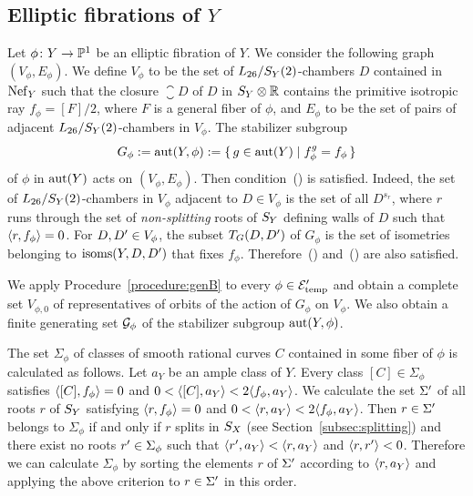 \documentclass{amsart}
\numberwithin{procedure}{section}
\begin{document}
\subsection{Elliptic fibrations of $Y$}\label{subsec:Ells}
%
Let $\phi\colon Y\to \P^1$ be an elliptic fibration of  $Y$.
We consider the following graph  $(V_{\phi}, E_{\phi})$.
We define $V_{\phi}$ to be the set of $\LSY$-chambers $D$ contained in $\NefY$
such that the closure $\closure{D}$  of $D$ in $\SY\tensor\R$ contains the 
primitive isotropic ray  $f_{\phi}=[F]/2$, where $F$ is a general fiber of $\phi$,
and $E_{\phi}$ to be the set of pairs of adjacent $\LSY$-chambers in $V_{\phi}$.
The stabilizer subgroup
\[
G_{\phi}:=\aut(Y, \phi):=\set{g\in \aut(Y)}{f_{\phi}^g=f_{\phi}}
\]
of $\phi$ in $\aut(Y)$
acts on $(V_{\phi}, E_{\phi})$.
Then condition~() is satisfied.
Indeed, the set of $\LSY$-chambers in $V_{\phi}$ adjacent to $D\in V_{\phi}$ is
the set of all 
$ D^{s_r}$, where $r$ runs through the set of  \emph{non-splitting} roots of $\SY$ 
defining walls of $D$
such that $\intf{r, f_{\phi}}=0$.
For $D, D\sprime\in V_{\phi}$,  the subset $\TG (D, D\sprime)$ of $G_{\phi}$ is
the set of isometries belonging to $\isoms(Y, D, D\sprime)$ that fixes $f_{\phi}$.
Therefore~() and~() are also satisfied.
\par
We apply Procedure~\ref{procedure:genB}
to every $\phi\in \Ells_{\temp}\sprime$
and obtain a complete set $V_{\phi, 0}$
of representatives of orbits of the action of $G_{\phi}$ on $V_{\phi}$.
We also obtain a finite generating set $\GGG_{\phi}$
of the stabilizer subgroup $\aut(Y, \phi)$. 
\par
The set $\Sigma_{\phi}$ of classes of smooth rational curves $C$
contained in some fiber of $\phi$ is calculated as follows.
Let $a_Y$ be an ample class of $Y$.
Every class $[C]\in \Sigma_{\phi}$ satisfies $\intf{[C], f_{\phi}}=0$ 
and $0<\intf{[C], a_Y}< 2\intf{f_{\phi}, a_Y}$.
We calculate the set  $\Sigma\sprime$ 
of all roots $r$ of $\SY$ satisfying 
$\intf{r, f_{\phi}}=0$ 
and $0<\intf{r, a_Y}<2\intf{f_{\phi}, a_Y}$.
Then $r\in \Sigma\sprime$ belongs to $\Sigma_{\phi}$
if and only if $r$ splits in $\SX$ (see Section~\ref{subsec:splitting})
and there exist no roots $r\sprime\in \Sigma_{\phi}$ such that
$\intf{r\sprime, a_Y}<\intf{r, a_Y}$ and $\intf{r, r\sprime}<0$.
Therefore we can calculate $\Sigma_{\phi}$ by sorting the elements 
$r$ of $\Sigma\sprime$ according to  $\intf{r, a_Y}$ 
and applying the above criterion to  $r\in \Sigma\sprime$ in this order.
\par
\end{document}
